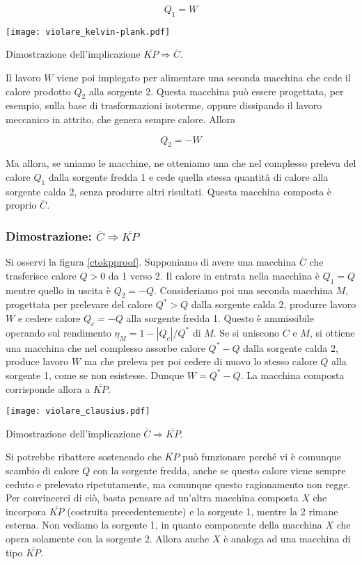 \[ Q_1 = W \]

\begin{marginfigure}
    \centering
    \texttt{[image: violare\_kelvin-plank.pdf]}
    \caption{Dimostrazione dell'implicazione $\overline{KP} \Rightarrow \overline{C}$.}
    \label{kptocproof}
\end{marginfigure}

\noindent Il lavoro $W$ viene poi impiegato per alimentare una
seconda macchina che cede il calore prodotto $Q_2$ alla sorgente
2. Questa macchina può essere progettata, per esempio, sulla base
di trasformazioni isoterme, oppure dissipando il lavoro meccanico
in attrito, che genera sempre calore. Allora

\[ Q_2 = -W \]

\noindent Ma allora,
se uniamo le macchine, ne otteniamo una che nel complesso preleva
del calore $Q_1$ dalla sorgente fredda 1 e cede quella stessa
quantità di calore alla sorgente calda 2, senza produrre altri
risultati. Questa macchina composta è proprio $\overline{C}$.

\subsubsection*{Dimostrazione: $\overline{C} \Rightarrow \overline{KP}$}
Si osservi la figura \ref{ctokpproof}.
Supponiamo di avere una macchina $\overline{C}$ che trasferisce
calore $Q > 0$ da 1 verso 2. Il calore in entrata nella macchina è
$Q_1 = Q$ mentre quello in uscita è $Q_2 = -Q$.
Consideriamo poi una seconda macchina $M$, progettata per prelevare
del calore $Q^* > Q$ dalla sorgente calda 2, produrre lavoro $W$
e cedere calore $Q_c = -Q$ alla sorgente fredda 1. Questo è ammissibile
operando sul rendimento $\eta_M = 1 - |Q_c|/Q^*$ di $M$.
Se si uniscono $\overline{C}$ e $M$, si ottiene una macchina che nel
complesso assorbe calore $Q^* - Q$ dalla sorgente calda 2, produce
lavoro $W$ ma che preleva per poi cedere di nuovo lo stesso calore
$Q$ alla sorgente 1, come se non esistesse. Dunque $W = Q^* - Q$.
La macchina composta corrisponde allora a $\overline{KP}$.

\begin{marginfigure}
    \centering
    \texttt{[image: violare\_clausius.pdf]}
    \caption{Dimostrazione dell'implicazione $\overline{C} \Rightarrow \overline{KP}$.}
    \label{ctokpproof}
\end{marginfigure}

Si potrebbe ribattere sostenendo che $\overline{KP}$ può funzionare
perché vi è comunque scambio di calore $Q$ con la sorgente fredda,
anche se questo calore viene sempre ceduto e prelevato ripetutamente,
ma comunque questo ragionamento non regge. Per convincerci di ciò,
basta pensare ad un'altra macchina composta $X$ che incorpora
$\overline{KP}$ (costruita precedentemente) e la sorgente 1, mentre la 2
rimane esterna. Non vediamo la sorgente 1, in quanto componente
della macchina $X$ che opera solamente con la sorgente 2. Allora anche $X$
è analoga ad una macchina di tipo $\overline{KP}$.


